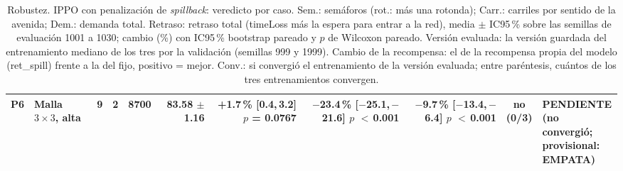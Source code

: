 \begin{table}[H]
\begin{tabular}{llcrrrrrrcl}
P6 & \makecell[l]{Malla $3 \times 3$,\\{}alta} & 9 & 2 & 8700 & \makecell[r]{83.58\\{}$\pm$ 1.16} & \makecell[r]{+1.7\,\%\\{}[0.4,\,3.2]\\$p$ = 0.0767} & \makecell[r]{$-$23.4\,\%\\{}[$-$25.1,\,$-$21.6]\\$p$ $<$\,0.001} & \makecell[r]{$-$9.7\,\%\\{}[$-$13.4,\,$-$6.4]\\$p$ $<$\,0.001} & \makecell[c]{no\\{}(0/3)} & \makecell[l]{PENDIENTE\\{}(no convergió;\\{}provisional:\\{}EMPATA)} \\
\bottomrule
\end{tabular}
\caption[Robustez: veredicto de IPPO con penalización de \textit{spillback}]{Robustez. IPPO con penalización de \textit{spillback}: veredicto por caso. Sem.: semáforos (rot.: más una rotonda); Carr.: carriles por sentido de la avenida; Dem.: demanda total. Retraso: retraso total (timeLoss más la espera para entrar a la red), media $\pm$ IC95\,\% sobre las semillas de evaluación 1001 a 1030; cambio (\%) con IC95\,\% bootstrap pareado y $p$ de Wilcoxon pareado. Versión evaluada: la versión guardada del entrenamiento mediano de los tres por la validación (semillas 999 y 1999). Cambio de la recompensa: el de la recompensa propia del modelo (ret\_spill) frente a la del fijo, positivo = mejor. Conv.: si convergió el entrenamiento de la versión evaluada; entre paréntesis, cuántos de los tres entrenamientos convergen.}
\label{tab:robustez-veredicto-ippo-spill}
\end{table}
